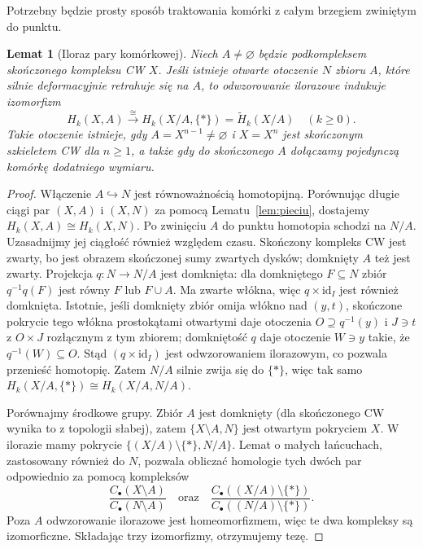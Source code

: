 \documentclass[11pt,a4paper,oneside]{report}
\newcommand{\id}{\mathrm{id}}
\theoremstyle{plain}
\newtheorem{lemat}[twierdzenie]{Lemat}
\theoremstyle{definition}
\theoremstyle{remark}
\begin{document}
Potrzebny będzie prosty sposób traktowania
komórki z całym brzegiem zwiniętym do punktu.

\begin{lemat}[Iloraz pary komórkowej]
\label{lem:iloraz-cw-homologia}
Niech $A\ne\varnothing$ będzie podkompleksem skończonego
kompleksu CW $X$. Jeśli istnieje otwarte
otoczenie $N$ zbioru $A$, które silnie
deformacyjnie retrahuje się na $A$, to
odwzorowanie ilorazowe indukuje izomorfizm
\[
 H_k(X,A)\xrightarrow{\ \cong\ }
 H_k(X/A,\{*\})=\widetilde H_k(X/A)
 \quad(k\geq0).
\]
Takie otoczenie istnieje, gdy
$A=X^{n-1}\ne\varnothing$ i $X=X^n$ jest skończonym
szkieletem CW dla $n\geq1$, a także gdy do skończonego $A$
dołączamy pojedynczą komórkę dodatniego wymiaru.
\end{lemat}
\begin{proof}
Włączenie $A\hookrightarrow N$ jest
równoważnością homotopijną. Porównując
długie ciągi par $(X,A)$ i $(X,N)$
za pomocą Lematu~\ref{lem:pieciu},
dostajemy $H_k(X,A)\cong H_k(X,N)$.
Po zwinięciu $A$ do punktu homotopia schodzi na $N/A$.
Uzasadnijmy jej ciągłość również względem czasu.
Skończony kompleks CW jest zwarty, bo jest obrazem skończonej
sumy zwartych dysków; domknięty $A$ też jest zwarty.
Projekcja $q:N\to N/A$ jest domknięta: dla domkniętego $F\subseteq N$
zbiór $q^{-1}q(F)$ jest równy $F$ lub $F\cup A$.
Ma zwarte włókna, więc $q\times\id_I$ jest również domknięta.
Istotnie, jeśli domknięty zbiór omija włókno nad $(y,t)$,
skończone pokrycie tego włókna prostokątami otwartymi daje
otoczenia $O\supseteq q^{-1}(y)$ i $J\ni t$ z $O\times J$
rozłącznym z tym zbiorem; domkniętość $q$ daje otoczenie
$W\ni y$ takie, że $q^{-1}(W)\subseteq O$.
Stąd $(q\times\id_I)$ jest odwzorowaniem ilorazowym,
co pozwala przenieść homotopię. Zatem $N/A$ silnie zwija się do $\{*\}$,
więc tak samo
$H_k(X/A,\{*\})\cong H_k(X/A,N/A)$.

Porównajmy środkowe grupy.
Zbiór $A$ jest domknięty
(dla skończonego CW wynika to
z topologii słabej), zatem
$\{X\setminus A,N\}$ jest
otwartym pokryciem $X$.
W ilorazie mamy pokrycie
$\{(X/A)\setminus\{*\},N/A\}$.
Lemat o małych łańcuchach,
zastosowany również do $N$,
pozwala obliczać homologie
tych dwóch par odpowiednio za pomocą kompleksów
\[
 \frac{C_\bullet(X\setminus A)}
      {C_\bullet(N\setminus A)}
 \quad\text{oraz}\quad
 \frac{C_\bullet((X/A)\setminus\{*\})}
      {C_\bullet((N/A)\setminus\{*\})}.
\]
Poza $A$ odwzorowanie ilorazowe jest
homeomorfizmem, więc te dwa
kompleksy są izomorficzne.
Składając trzy izomorfizmy,
otrzymujemy tezę.


\end{proof}
\end{document}

